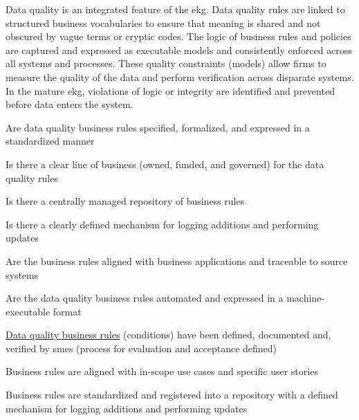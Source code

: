 %
%

\ekgmmCapabilitySectionContributionToEnterprise

Data quality is an integrated feature of the \gls{ekg}.
Data quality rules are linked to structured business vocabularies to ensure that meaning
is shared and not obscured by vague terms or cryptic codes.
The logic of business rules and policies are captured and expressed as executable models and consistently
enforced across all systems and processes.
These quality constraints (models) allow firms to measure the quality of the data and perform verification across
disparate systems.
In the mature \gls{ekg}, violations of logic or integrity are identified and prevented before data
enters the system.

\ekgmmCapabilitySectionDimensions

\begin{core-questions}

  \item [\thesection.1] Are data quality business rules specified, formalized, and expressed in a standardized manner
  \item [\thesection.2] Is there a clear line of business  (owned, funded, and governed) for the
                        data quality rules
  \item [\thesection.3] Is there a centrally managed repository of business rules
  \item [\thesection.4] Is there a clearly defined mechanism for logging additions and performing updates
  \item [\thesection.5] Are the business rules aligned with business applications and traceable to source systems
  \item [\thesection.6] Are the data quality business rules automated and expressed in a machine-executable format

\end{core-questions}

\ekgmmCapabilitySectionLevelsOneFive

\ekgmmscoringlevelOne

\begin{scoring}

  \item \hyperref[sec:ekg-mm-data-quality-business-rules]{Data quality business rules} (conditions) have been defined,
        documented and, verified by \glspl{sme} (process for evaluation and acceptance defined)
  \item Business rules are aligned with in-scope use cases and specific user stories
  \item Business rules are standardized and registered into a repository with a defined mechanism for logging
        additions and performing updates

\end{scoring}

